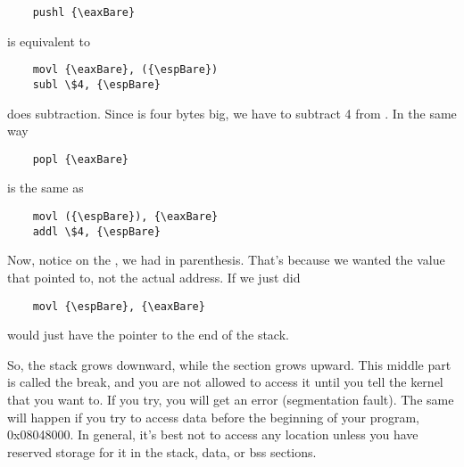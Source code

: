 \begin{simpletyping}
\begin{lstlisting}
	pushl {\eaxBare}
\end{lstlisting}
\end{simpletyping}

is equivalent to

\begin{simpletyping}
\begin{lstlisting}
	movl {\eaxBare}, ({\espBare})
	subl \$4, {\espBare}
\end{lstlisting}
\end{simpletyping}

 does subtraction.  Since \icode{{\eaxBare}}
is four bytes big, we have to subtract 4 from \icode{{\espBare}}.
In the same way

\begin{simpletyping}
\begin{lstlisting}
	popl {\eaxBare}
\end{lstlisting}
\end{simpletyping}

is the same as

\begin{simpletyping}
\begin{lstlisting}
	movl ({\espBare}), {\eaxBare}
	addl \$4, {\espBare}
\end{lstlisting}
\end{simpletyping}

Now, notice on the , we had \icode{{\espBare}}
in parenthesis.  That's because we wanted the value that \icode{{\espBare}}
pointed to, not the actual address.  If we just did

\begin{simpletyping}
\begin{lstlisting}
	movl {\espBare}, {\eaxBare}
\end{lstlisting}
\end{simpletyping}

\icode{{\eaxBare}} would just have the pointer to the end of the stack.

So, the stack grows downward, while the  section grows 
upward.  This middle part is called the break, and you are not allowed to 
access it until you tell the kernel that you want to.  If you try, you
will get an error (segmentation fault).  The same will happen if you try to
access data before the beginning of your program, 0x08048000.  In general,
it's best not to access any location unless you have reserved storage
for it in the stack, data, or bss sections.

